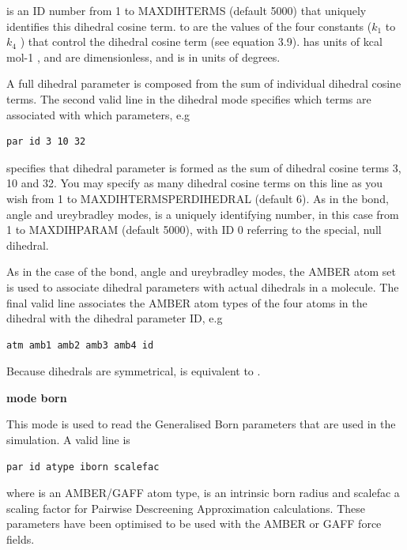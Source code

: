 \documentclass[letterpaper,10pt,english]{sphinxmanual}
\begin{document}
 is an ID number from 1 to MAXDIHTERMS (default 5000) that uniquely identifies this dihedral cosine term.  to  are the values of the four constants (\(k_1\) to \(k_4\) ) that control the dihedral cosine term (see equation 3.9).  has units of kcal mol-1 ,  and  are dimensionless, and  is in units of degrees.

A full dihedral parameter is composed from the sum of individual dihedral cosine terms. The second valid line in the dihedral mode specifies which terms are associated with which parameters, e.g

\begin{Verbatim}[commandchars=\\\{\}]
par id 3 10 32
\end{Verbatim}

specifies that dihedral parameter  is formed as the sum of dihedral cosine terms 3, 10 and 32. You may specify as many dihedral cosine terms on this line as you wish from 1 to MAXDIHTERMSPERDIHEDRAL (default 6). As in the bond, angle and ureybradley modes,  is a uniquely identifying number, in this case from 1 to MAXDIHPARAM (default 5000), with ID 0 referring to the special, null dihedral.

As in the case of the bond, angle and ureybradley modes, the AMBER atom set is used to associate dihedral parameters with actual dihedrals in a molecule. The final valid line associates the AMBER atom types of the four  atoms in the dihedral with the dihedral parameter ID, e.g

\begin{Verbatim}[commandchars=\\\{\}]
atm amb1 amb2 amb3 amb4 id
\end{Verbatim}

Because dihedrals are symmetrical,  is equivalent to .

\textbf{mode born}

This mode is used to read the Generalised Born parameters that are used in the simulation. A valid line is

\begin{Verbatim}[commandchars=\\\{\}]
par id atype iborn scalefac
\end{Verbatim}

where  is an AMBER/GAFF atom type,  is an intrinsic born radius and scalefac a scaling factor for Pairwise Descreening Approximation calculations. These parameters have been optimised to be used with the AMBER or GAFF force fields.
\end{document}
